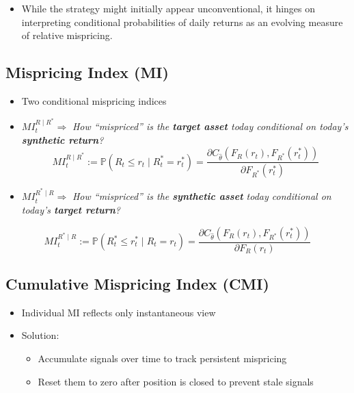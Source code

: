 \documentclass[
  letterpaper,
  DIV=11,
  numbers=noendperiod]{scrartcl}
\providecommand{\tightlist}{%
  \setlength{\itemsep}{0pt}\setlength{\parskip}{0pt}}\usepackage{longtable,booktabs,array}
\begin{document}
\begin{itemize}
\tightlist
\item
  While the strategy might initially appear unconventional, it hinges on
  interpreting conditional probabilities of daily returns as an evolving
  measure of relative mispricing.
\end{itemize}

\subsection{Mispricing Index (MI)}\label{mispricing-index-mi}

\begin{itemize}
\item
  Two conditional mispricing indices
\item
  \(MI_t^{R \mid R^*}\Rightarrow\) \emph{How ``mispriced'' is the
  \textbf{target asset} today conditional on today's \textbf{synthetic
  return}?} \[
  MI_t^{R \mid R^*} := \mathbb{P}(R_t \leq r_t \mid R_t^* = r_t^*) = \frac{\partial C_{\hat{\theta}}(F_R(r_t), F_{R^*}(r_t^*))}{\partial F_{R^*}(r_t^*)}
  \]
\end{itemize}

\begin{itemize}
\tightlist
\item
  \(MI_t^{R^* \mid R}\Rightarrow\) \emph{How ``mispriced'' is the
  \textbf{synthetic asset} today conditional on today's \textbf{target
  return}?}
\end{itemize}

\[
MI_t^{R^* \mid R} := \mathbb{P}(R_t^* \leq r_t^* \mid R_t = r_t) = \frac{\partial C_{\hat{\theta}}(F_R(r_t), F_{R^*}(r_t^*))}{\partial F_R(r_t)}
\]

\subsection{Cumulative Mispricing Index
(CMI)}\label{cumulative-mispricing-index-cmi}

\begin{itemize}
\tightlist
\item
  Individual MI reflects only instantaneous view
\item
  Solution:

  \begin{itemize}
  \tightlist
  \item
    Accumulate signals over time to track persistent mispricing
  \item
    Reset them to zero after position is closed to prevent stale signals
  \end{itemize}
\end{itemize}
\end{document}
